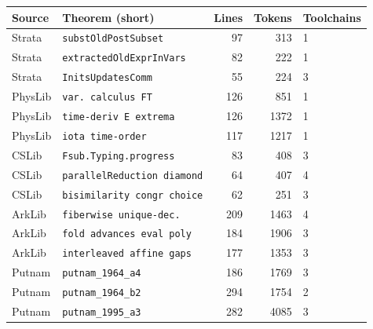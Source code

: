 \begin{tabular}{llrrl}
  \toprule
  Source & Theorem (short) & Lines & Tokens & Toolchains \\
  \midrule
  Strata & \texttt{substOldPostSubset} & 97 & 313 & 1 \\
  Strata & \texttt{extractedOldExprInVars} & 82 & 222 & 1 \\
  Strata & \texttt{InitsUpdatesComm} & 55 & 224 & 3 \\
  PhysLib & \texttt{var. calculus FT} & 126 & 851 & 1 \\
  PhysLib & \texttt{time-deriv E extrema} & 126 & 1372 & 1 \\
  PhysLib & \texttt{iota time-order} & 117 & 1217 & 1 \\
  CSLib & \texttt{Fsub.Typing.progress} & 83 & 408 & 3 \\
  CSLib & \texttt{parallelReduction diamond} & 64 & 407 & 4 \\
  CSLib & \texttt{bisimilarity congr choice} & 62 & 251 & 3 \\
  ArkLib & \texttt{fiberwise unique-dec.} & 209 & 1463 & 4 \\
  ArkLib & \texttt{fold advances eval poly} & 184 & 1906 & 3 \\
  ArkLib & \texttt{interleaved affine gaps} & 177 & 1353 & 3 \\
  Putnam & \texttt{putnam\_1964\_a4} & 186 & 1769 & 3 \\
  Putnam & \texttt{putnam\_1964\_b2} & 294 & 1754 & 2 \\
  Putnam & \texttt{putnam\_1995\_a3} & 282 & 4085 & 3 \\
  \bottomrule
\end{tabular}
